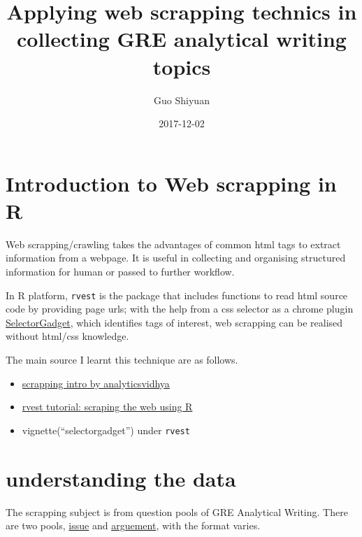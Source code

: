 \documentclass[]{article}
\title{Applying web scrapping technics in collecting GRE analytical writing
topics}
\author{Guo Shiyuan}
\date{2017-12-02}
\providecommand{\tightlist}{%
  \setlength{\itemsep}{0pt}\setlength{\parskip}{0pt}}
\begin{document}
\maketitle

\hypertarget{introduction-to-web-scrapping-in-r}{%
\section{Introduction to Web scrapping in
R}\label{introduction-to-web-scrapping-in-r}}

Web scrapping/crawling takes the advantages of common html tags to
extract information from a webpage. It is useful in collecting and
organising structured information for human or passed to further
workflow.

In R platform, \texttt{rvest} is the package that includes functions to
read html source code by providing page urls; with the help from a css
selector as a chrome plugin
\href{http://selectorgadget.com/}{SelectorGadget}, which identifies tags
of interest, web scrapping can be realised without html/css knowledge.

The main source I learnt this technique are as follows.

\begin{itemize}
\tightlist
\item
  \href{https://www.analyticsvidhya.com/blog/2017/03/beginners-guide-on-web-scraping-in-r-using-rvest-with-hands-on-knowledge/}{scrapping
  intro by analyticsvidhya}
\item
  \href{https://stat4701.github.io/edav/2015/04/02/rvest_tutorial/}{rvest
  tutorial: scraping the web using R}
\item
  vignette(``selectorgadget'') under \texttt{rvest}
\end{itemize}

\hypertarget{understanding-the-data}{%
\section{understanding the data}\label{understanding-the-data}}

The scrapping subject is from question pools of GRE Analytical Writing.
There are two pools,
\href{https://www.ets.org/gre/revised_general/prepare/analytical_writing/issue/pool}{issue}
and
\href{https://www.ets.org/gre/revised_general/prepare/analytical_writing/argument/pool}{arguement},
with the format varies.
\end{document}
